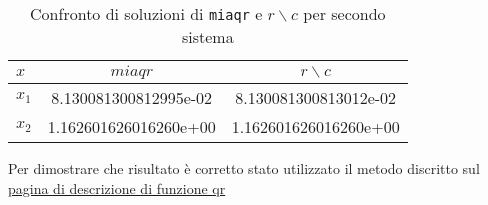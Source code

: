 \FloatBarrier
\begin{table}[ht]
   \centering
   \renewcommand\arraystretch{2}
   \begin{tabular}{| l | c c |}
      \hline
      $x$     & $miaqr$               & $r \backslash c$      \\
      \hline
      $x_{1}$ & 8.130081300812995e-02 & 8.130081300813012e-02 \\
      $x_{2}$ & 1.162601626016260e+00 & 1.162601626016260e+00 \\
      \hline
   \end{tabular}
   \caption{Confronto di soluzioni di \lstinline{miaqr} e $r \backslash c$ per secondo sistema}
   \label{tab:12_2}
\end{table}
Per dimostrare che risultato è corretto stato utilizzato il metodo discritto sul
\href{https://it.mathworks.com/help/matlab/ref/qr.html}{pagina di descrizione di funzione qr}
\FloatBarrier
